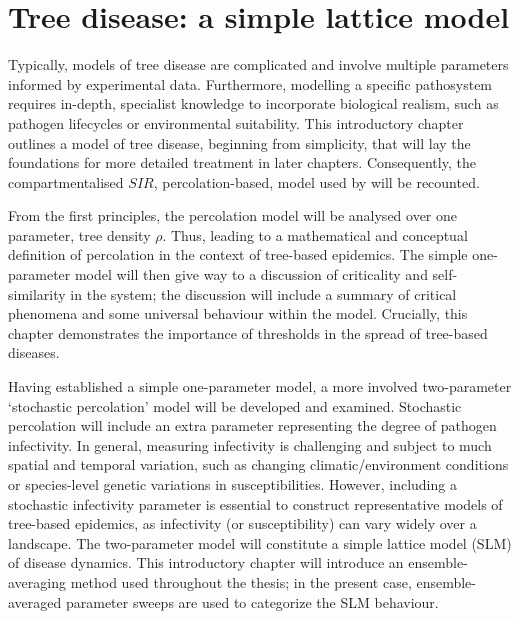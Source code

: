 
\chapter{Tree disease: a simple lattice model}
\label{chapter:SLM}

Typically, models of tree disease are complicated and involve multiple parameters informed by experimental data. Furthermore, modelling a specific pathosystem requires in-depth, specialist knowledge to incorporate biological realism, such as pathogen lifecycles or environmental suitability. This introductory chapter outlines a model of tree disease, beginning from simplicity, that will lay the foundations for more detailed treatment in later chapters.
Consequently, the compartmentalised $SIR$, percolation-based, model used by \cite{OROZCOFUENTES201912} will be recounted. 

From the first principles, the percolation model will be analysed over one parameter, tree density $\rho$.
Thus, leading to a mathematical and conceptual definition of percolation in the context of tree-based epidemics. 
The simple one-parameter model will then give way to a discussion of criticality and self-similarity in the system;
the discussion will include a summary of critical phenomena and some universal behaviour within the model.
Crucially, this chapter demonstrates the importance of thresholds in the spread of tree-based diseases.

Having established a simple one-parameter model, a more involved two-parameter `stochastic percolation' model will be developed and examined. 
Stochastic percolation will include an extra parameter representing the degree of pathogen infectivity. 
In general, measuring infectivity is challenging and subject to much spatial and temporal variation, such as changing climatic/environment conditions or species-level genetic variations in susceptibilities.  
However, including a stochastic infectivity parameter is essential to construct representative models of tree-based epidemics, as infectivity (or susceptibility) can vary widely over a landscape.
The two-parameter model will constitute a simple lattice model (SLM) of disease dynamics. 
This introductory chapter will introduce an ensemble-averaging method used throughout the thesis;
in the present case, ensemble-averaged parameter sweeps are used to categorize the SLM behaviour.

